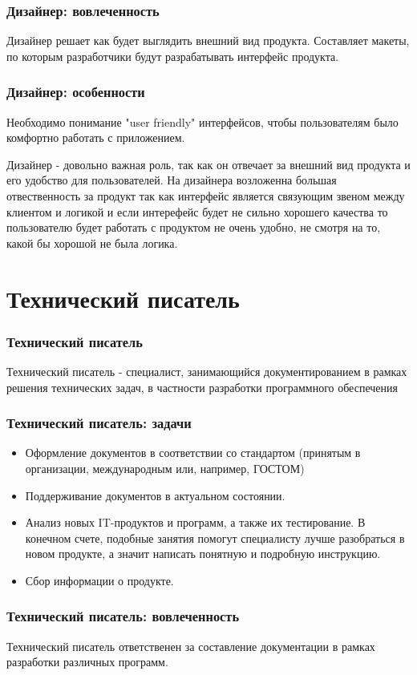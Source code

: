 \documentclass{../industrial-development}
\begin{document}
	\begin{frame} \frametitle{Дизайнер: вовлеченность}
		Дизайнер решает как будет выглядить внешний вид продукта. Составляет макеты, по которым разработчики будут разрабатывать интерфейс продукта.
	\end{frame}
	
	\begin{frame} \frametitle{Дизайнер: особенности}
		Необходимо понимание "user friendly" интерфейсов, чтобы пользователям было комфортно работать с приложением.
	\end{frame}

	\lecturenotes
		Дизайнер - довольно важная роль, так как он отвечает за внешний вид продукта и его удобство для пользователей. На дизайнера возложенна большая отвественность за продукт так как интерфейс является связующим звеном между клиентом и логикой и если интерефейс будет не сильно хорошего качества то пользователю будет работать с продуктом не очень удобно, не смотря на то, какой бы хорошой не была логика.
	
	\section{Технический писатель }
	
	\begin{frame} \frametitle{Технический писатель}
		\begin{block}{}
			\alert {Технический писатель} - специалист, занимающийся документированием в рамках решения технических задач, в частности разработки программного обеспечения
		\end{block}
	\end{frame}
	
	\begin{frame} \frametitle{Технический писатель: задачи}
		\begin{itemize}
			\item Оформление документов в соответствии со стандартом (принятым в организации, международным или, например, ГОСТОМ)
			\item Поддерживание документов в актуальном состоянии.
			\item Анализ новых IT-продуктов и программ, а также их тестирование. В конечном счете, подобные занятия помогут специалисту лучше разобраться в новом продукте, а значит написать понятную и подробную инструкцию.
			\item Сбор информации о продукте.
		\end{itemize}
	\end{frame}
	\begin{frame} \frametitle{Технический писатель: вовлеченность}
		Технический писатель ответственен за составление документации в рамках разработки различных программ.
	\end{frame}
	
\end{document}
